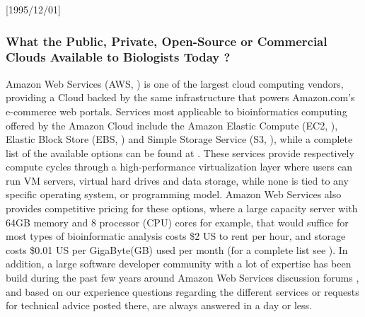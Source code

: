\NeedsTeXFormat{LaTeX2e}[1995/12/01] \documentclass[10pt]{bmc_article}
\newenvironment{bmcformat}{\begin{raggedright}\baselineskip20pt\sloppy\setboolean{publ}{false}}{\end{raggedright}\baselineskip20pt\sloppy}
\begin{document}
\begin{bmcformat}
\subsubsection*{What the Public, Private, Open-Source or Commercial Clouds Available to Biologists Today ?} 

Amazon Web Services (AWS, \cite{aws}) is one of the largest cloud computing vendors, providing a Cloud backed  
by the same infrastructure that powers Amazon.com's e-commerce web portals. Services most applicable to 
bioinformatics computing offered by the Amazon Cloud include the Amazon Elastic Compute (EC2, \cite{awsec2}),  
Elastic Block Store (EBS, \cite{ebs}) and Simple Storage Service (S3, \cite{s3}), while a complete list of the available 
options can be found at \cite{aws}. These services provide respectively compute cycles through a high-performance 
virtualization layer where users can run VM servers, virtual hard drives and data storage, while none
is tied to any specific operating system, or programming model. Amazon Web Services also provides competitive
pricing for these options, where a large capacity server with 64GB memory and 8 processor (CPU) cores for 
example, that would suffice for most types of bioinformatic analysis costs \$2 US to rent per hour, and storage costs 
\$0.01 US per GigaByte(GB) used per month (for a complete list see \cite{ec2price}). In addition, a large software 
developer community with a lot of expertise has been build during the past few years around Amazon Web Services 
discussion forums \cite{awsforums}, and based on our experience questions regarding the different services or 
requests for technical advice posted there, are always answered in a day or less.


\end{bmcformat}
\end{document}
